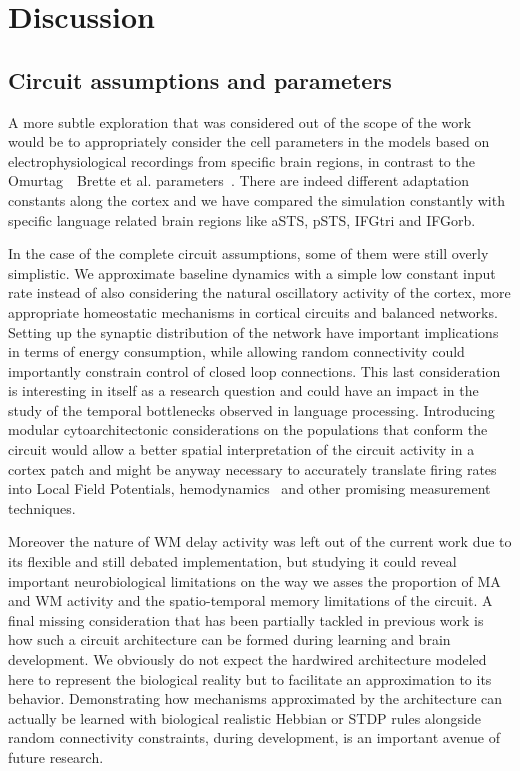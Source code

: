 \documentclass[10pt]{article}
\begin{document}
\section{Discussion}
{\label{sec:discussion}}


\subsection{Circuit assumptions and parameters}

A more subtle exploration that was considered out of the scope of the work would be to appropriately consider the cell parameters in the models based on electrophysiological recordings from specific brain regions, in contrast to the Omurtag~\cite{omurtag2000simulation}~Brette et al. parameters~\cite{Brette_2005}.
There are indeed different adaptation constants along the cortex and we have compared the simulation constantly with specific language related brain regions like aSTS, pSTS, IFGtri and IFGorb.

In the case of the complete circuit assumptions, some of them were still overly simplistic.
We approximate baseline dynamics with a simple low constant input rate instead of also considering the natural oscillatory activity of the cortex, more appropriate homeostatic mechanisms in cortical circuits\cite{turrigiano2011too} and balanced networks\cite{Wolf_2014}.
Setting up the synaptic distribution of the network have important implications in terms of energy consumption, while allowing random connectivity could importantly constrain control of closed loop connections.
This last consideration is interesting in itself as a research question and could have an impact in the study of the temporal bottlenecks observed in language processing\cite{Vagharchakian_2012}.
Introducing modular cytoarchitectonic considerations on the populations that conform the circuit would allow a better spatial interpretation of the circuit activity in a cortex patch and might be anyway necessary to accurately translate firing rates into Local Field Potentials\cite{Mazzoni_2015,Hagen_2015}, hemodynamics~\cite{Buxton_2004} and other promising measurement techniques.

Moreover the nature of WM delay activity was left out of the current work due to its flexible and still debated implementation\cite{de_Kamps_2005}, but studying it could reveal important neurobiological limitations on the way we asses the proportion of MA and WM activity and the spatio-temporal memory limitations of the circuit.
A final missing consideration that has been partially tackled in previous work\cite{van_der_Velde_2011} is how such a circuit architecture can be formed during learning and brain development.
We obviously do not expect the hardwired architecture modeled here to represent the biological reality but to facilitate an approximation to its behavior.
Demonstrating how mechanisms approximated by the architecture can actually be learned with biological realistic Hebbian or STDP rules alongside random connectivity constraints, during development, is an important avenue of future research.
\end{document}
